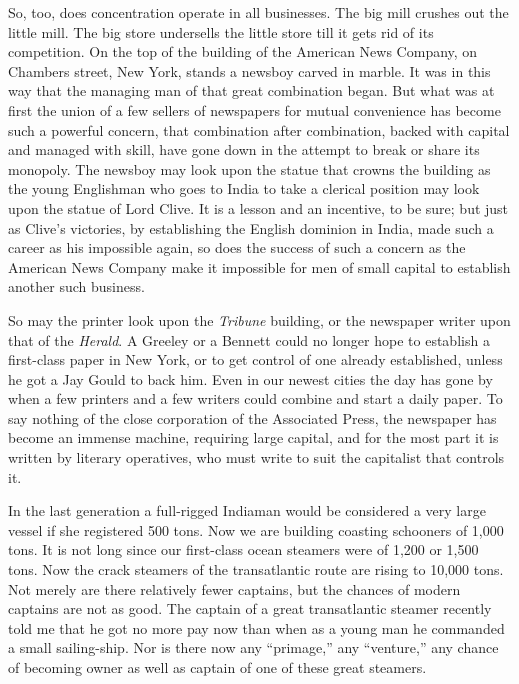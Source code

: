 \documentclass{book}
\begin{document}
So, too, does concentration operate in all businesses. The big mill crushes out the little mill. The big store undersells the little store till it gets rid of its competition. On the top of the building of the American News Company, on Chambers street, New York, stands a newsboy carved in marble. It was in this way that the managing man of that great combination began. But what was at first the union of a few sellers of newspapers for mutual convenience has become such a powerful concern, that combination after combination, backed with capital and managed with skill, have gone down in the attempt to break or share its monopoly. The newsboy may look upon the statue that crowns the building as the young Englishman who goes to India to take a clerical position may look upon the statue of Lord Clive. It is a lesson and an incentive, to be sure; but just as Clive’s victories, by establishing the English dominion in India, made such a career as his impossible again, so does the success of such a concern as the American News Company make it impossible for men of small capital to establish another such business.

So may the printer look upon the \emph{Tribune} building, or the newspaper writer upon that of the \emph{Herald}. A Greeley or a Bennett could no longer hope to establish a first-class paper in New York, or to get control of one already established, unless he got a Jay Gould to back him. Even in our newest cities the day has gone by when a few printers and a few writers could combine and start a daily paper. To say nothing of the close corporation of the Associated Press, the newspaper has become an immense machine, requiring large capital, and for the most part it is written by literary operatives, who must write to suit the capitalist that controls it.

In the last generation a full-rigged Indiaman would be considered a very large vessel if she registered 500 tons. Now we are building coasting schooners of 1,000 tons. It is not long since our first-class ocean steamers were of 1,200 or 1,500 tons. Now the crack steamers of the transatlantic route are rising to 10,000 tons. Not merely are there relatively fewer captains, but the chances of modern captains are not as good. The captain of a great transatlantic steamer recently told me that he got no more pay now than when as a young man he commanded a small sailing-ship. Nor is there now any “primage,” any “venture,” any chance of becoming owner as well as captain of one of these great steamers.
\end{document}
